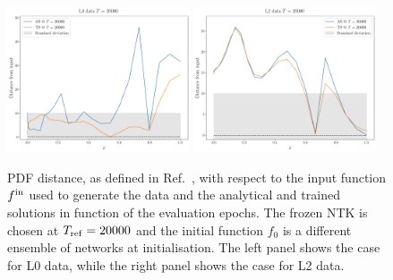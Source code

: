   \begin{figure}[ht!]
    \centering
    \includegraphics[width=0.48\textwidth]{plots/analytical_solution/xT3/distance_from_input/L0/linear/distance_from_input_epoch_20000_L0_linear.pdf}
    \includegraphics[width=0.48\textwidth]{plots/analytical_solution/xT3/distance_from_input/L2/linear/distance_from_input_epoch_20000_L2_linear.pdf}
    \caption{PDF distance, as defined in Ref.~\cite{NNPDF:2021njg}, with respect
    to the input function $f^{\rm in}$ used to generate the data and the analytical
    and trained solutions in function of the evaluation epochs. The frozen NTK
    is chosen at $T_{\rm ref} = 20000$ and the initial function $f_0$ is a
    different ensemble of networks at initialisation. The left panel shows the
    case for L0 data, while the right panel shows the case for L2 data.}
    \label{fig:xT3_distance_L0_L2}
  \end{figure}



